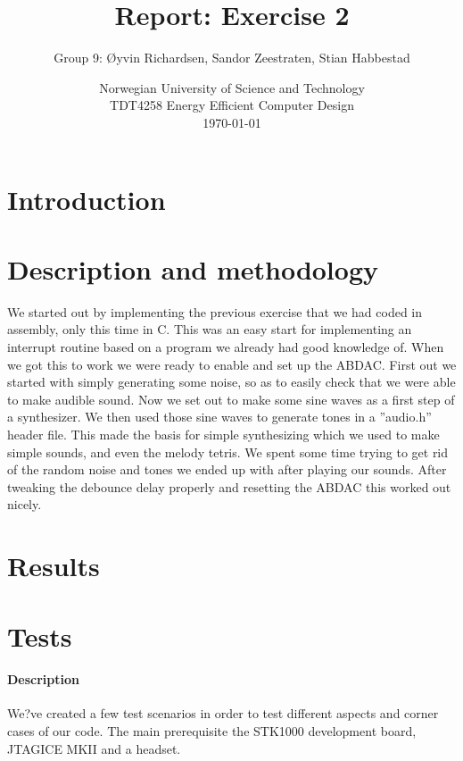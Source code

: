 \documentclass[a4paper,11pt]{article}
\title{\textbf{Report: Exercise 2}}
\author{Group 9: \O yvin Richardsen, Sandor Zeestraten, Stian Habbestad}
\date{{Norwegian University of Science and Technology \\
TDT4258 Energy Efficient Computer Design \\}
\today}
\begin{document}
\maketitle

\begin{abstract}

\end{abstract}

\tableofcontents
\newpage

\section{Introduction} 



\section{Description and methodology}
We started out by implementing the previous exercise that we had coded in assembly, only this time in C. This was an easy start for implementing an interrupt routine based on a program we already had good knowledge of. When we got this to work we were ready to enable and set up the ABDAC. First out we started with simply generating some noise, so as to easily check that we were able to make audible sound. Now we set out to make some sine waves as a first step of a synthesizer. We then used those sine waves to generate tones in a ''audio.h'' header file. This made the basis for simple synthesizing which we used to make simple sounds, and even the melody tetris. 
We spent some time trying to get rid of the random noise and tones we ended up with after playing our sounds. After tweaking the debounce delay properly and resetting the ABDAC this worked out nicely. 

\section{Results}



\section{Tests}
\paragraph{Description}
We?ve created a few test scenarios in order to test different aspects and corner cases of our code. The main prerequisite the STK1000 development board, JTAGICE MKII and a headset. 
\end{document}
